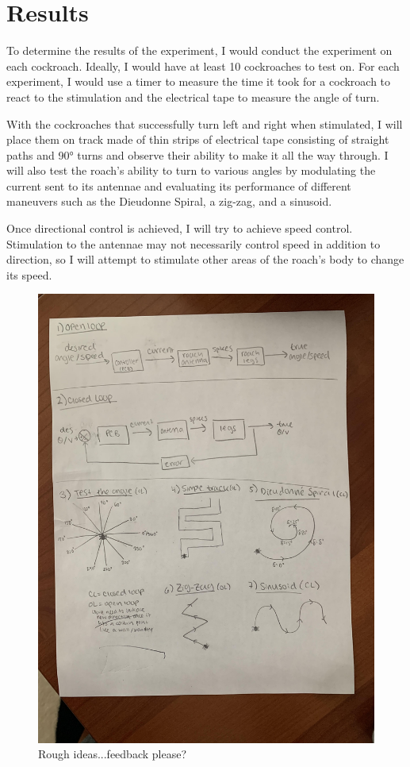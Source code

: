 \section{Results}


To determine the results of the experiment, I would conduct the experiment on each cockroach. Ideally, I would have at least 10 cockroaches to test on. For each experiment, I would use a timer to measure the time it took for a cockroach to react to the stimulation and the electrical tape to measure the angle of turn. 


With the cockroaches that successfully turn left and right when stimulated, I will place them on track made of thin strips of electrical tape consisting of straight paths and \ang{90} turns and observe their ability to make it all the way through. I will also test the roach's ability to turn to various angles by modulating the current sent to its antennae and evaluating its performance of different maneuvers such as the Dieudonne Spiral, a zig-zag, and a sinusoid. %

Once directional control is achieved, I will try to achieve speed control. Stimulation to the antennae may not necessarily control speed in addition to direction, so I will attempt to stimulate other areas of the roach's body to change its speed.

{\begin{figure}[ht!]
\centering
\includegraphics[scale=0.1]{Figures/OpenClosedLoops.jpg}
\caption{Rough ideas...feedback please?}
\label{fig:rough}
\end{figure}}


 